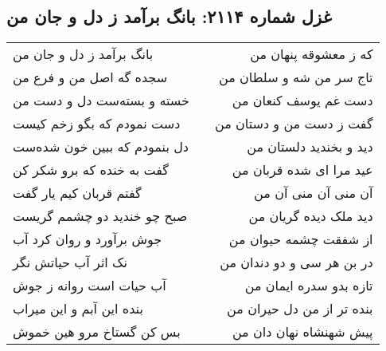 \begin{center}
\section*{غزل شماره ۲۱۱۴: بانگ برآمد ز دل و جان من}
\label{sec:2114}
\begin{longtable}{l p{0.5cm} r}
بانگ برآمد ز دل و جان من
&&
که ز معشوقه پنهان من
\\
سجده گه اصل من و فرع من
&&
تاج سر من شه و سلطان من
\\
خسته و بسته‌ست دل و دست من
&&
دست غم یوسف کنعان من
\\
دست نمودم که بگو زخم کیست
&&
گفت ز دست من و دستان من
\\
دل بنمودم که ببین خون شده‌ست
&&
دید و بخندید دلستان من
\\
گفت به خنده که برو شکر کن
&&
عید مرا ای شده قربان من
\\
گفتم قربان کیم یار گفت
&&
آن منی آن منی آن من
\\
صبح چو خندید دو چشمم گریست
&&
دید ملک دیده گریان من
\\
جوش برآورد و روان کرد آب
&&
از شفقت چشمه حیوان من
\\
نک اثر آب حیاتش نگر
&&
در بن هر سی و دو دندان من
\\
آب حیات است روانه ز جوش
&&
تازه بدو سدره ایمان من
\\
بنده این آبم و این میراب
&&
بنده تر از من دل حیران من
\\
بس کن گستاخ مرو هین خموش
&&
پیش شهنشاه نهان دان من
\\
\end{longtable}
\end{center}
